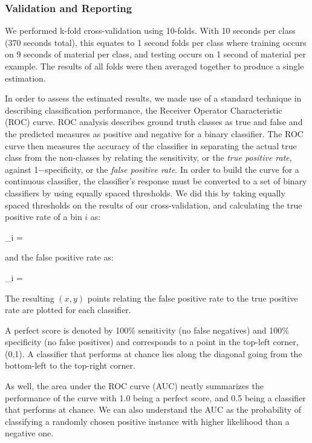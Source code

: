 \documentclass[a4paper,10pt,final]{ThesisStyle}
\begin{document}
\subsubsection{Validation and Reporting}
\label{sec:ROC}
We performed k-fold cross-validation using 10-folds.  With 10 seconds per class (370 seconds total), this equates to 1 second folds per class where training occurs on 9 seconds of material per class, and testing occurs on 1 second of material per example. The results of all folds were then averaged together to produce a single estimation.

In order to assess the estimated results, we made use of a standard technique in describing classification performance, the Receiver Operator Characteristic (ROC) curve.  ROC analysis describes ground truth classes as true and false and the predicted measures as positive and negative for a binary classifier.  The ROC curve then measures the accuracy of the classifier in separating the actual true class from the non-classes by relating the sensitivity, or the \textit{true positive rate}, against 1$-$specificity, or the \textit{false positive rate}.   In order to build the curve for a continuous classifier, the classifier's response must be converted to a set of binary classifiers by using equally spaced thresholds.  We did this by taking equally spaced thresholds on the results of our cross-validation, and calculating the true positive rate of a bin $i$ as: 

\begin{equationb}
_i = 
\end{equationb}

and the false positive rate as: 

\begin{equationb}
_i = 
\end{equationb}

The resulting $(x,y)$ points relating the false positive rate to the true positive rate are plotted for each classifier.

A perfect score is denoted by 100\% sensitivity (no false negatives) and 100\% specificity (no false positives) and corresponds to a point in the top-left corner, (0,1).  A classifier that performs at chance lies along the diagonal going from the bottom-left to the top-right corner.  

As well, the area under the ROC curve (AUC) neatly summarizes the performance of the curve with 1.0 being a perfect score, and 0.5 being a classifier that performs at chance.  We can also understand the AUC as the probability of classifying a randomly chosen positive instance with higher likelihood than a negative one.
\end{document}
